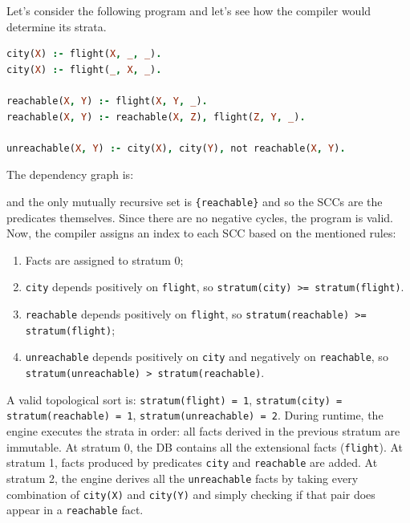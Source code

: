 \begin{example}{}
    Let's consider the following program and let's see how the compiler would determine its strata.
    \begin{lstlisting}[language=prolog]
city(X) :- flight(X, _, _).
city(X) :- flight(_, X, _).

reachable(X, Y) :- flight(X, Y, _).
reachable(X, Y) :- reachable(X, Z), flight(Z, Y, _).

unreachable(X, Y) :- city(X), city(Y), not reachable(X, Y).
    \end{lstlisting}
    The dependency graph is:
    \begin{center}
\end{center}
    and the only mutually recursive set is \texttt{\{reachable\}} and so the SCCs are the predicates themselves.
    Since there are no negative cycles, the program is valid.
    Now, the compiler assigns an index to each SCC based on the mentioned rules:
    \begin{enumerate}
        \item Facts are assigned to stratum 0;
        \item \texttt{city} depends positively on \texttt{flight}, so \texttt{stratum(city) >= stratum(flight)}.
        \item \texttt{reachable} depends positively on \texttt{flight}, so \texttt{stratum(reachable) >= stratum(flight)};
        \item \texttt{unreachable} depends positively on \texttt{city} and negatively on \texttt{reachable}, so \texttt{stratum(unreachable) > stratum(reachable)}.
    \end{enumerate}
    A valid topological sort is: \texttt{stratum(flight) = 1}, \texttt{stratum(city) = stratum(reachable) = 1}, \texttt{stratum(unreachable) = 2}.
    During runtime, the engine executes the strata in order: all facts derived in the previous stratum are immutable.
    At stratum 0, the DB contains all the extensional facts (\texttt{flight}).
    At stratum 1, facts produced by predicates \texttt{city} and \texttt{reachable} are added.
    At stratum 2, the engine derives all the \texttt{unreachable} facts by taking every combination of \texttt{city(X)} and \texttt{city(Y)} and simply checking if that pair does appear in a \texttt{reachable} fact.
\end{example}

